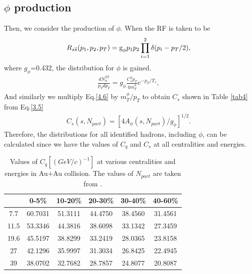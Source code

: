 \documentclass[twocolumn,aps,superscriptaddress,showpacs,nofootinbib,floatfix]{revtex4}
\begin{document}
\subsection{$\phi$ production}
Then, we consider the production of $\phi$. When the RF is taken to be \cite{Hwa:2006vb}
\begin{eqnarray}
R_{s\overline s}(p_1,p_2,p_T)={\text g}_{\phi}p_1p_2 \prod \limits_{i=1}^2\delta(p_i-p_T/2),\label{4.5}
\end{eqnarray}
where $g_{\phi}$=0.432, the distribution for $\phi$ is gained.
\begin{eqnarray}
	\frac{dN_{\phi}^{TT}}{p_Tdp_T}=g_{\phi}\frac{C_s^2p_T}{4m_T^{\phi}}e^{-p_T/T_s}, \label{4.6}
\end{eqnarray}
And similarly we multiply Eq.\ref{4.6} by $m_T^{\phi}/p_T$ to obtain $C_s$ shown in Table \ref{tab4} from Eq.\ref{3.5}
\begin{eqnarray}
C_s(s,N_{part})=[4A_{\phi}(s,N_{part})/g_{\phi}]^{1/2} .\label{4.7}
\end{eqnarray}
Therefore, the distributions for all identified hadrons, including $\phi$, can be calculated since we have the values of $C_q$ and $C_s$ at all centralities and energies.
\begin{table}[htbp]
		\centering
			\begin{tabular}{cccccc}
				\hline
				\hline
				\diagbox[width=12em]{$\sqrt{s}$(GeV)}{centrality}   &  0-5\%&10-20\%&20-30\%&30-40\%&40-60\%\\
				\hline
				7.7  &  60.7031  & 51.3111 &  44.4750  & 38.4560 &  31.4561\\
				11.5 &  53.3346 &  44.3816  & 38.6098 &  33.1342  & 27.3459\\
				19.6	&  45.5197 &  38.8299  & 33.2419 &  28.0365  & 23.8158\\
				27  &  42.1296 &  35.9997  & 31.3034 &  26.8425  & 22.4945\\
				39   &  38.0702 &  32.7682  & 28.7857 &  24.8077  & 20.8087\\
				\hline
				\hline
			\end{tabular}
	\caption{Values of $C_q[(GeV/c)^{-1}]$ at various centralities and energies in Au+Au collision. The values of $N_{part}$ are taken from \cite{STAR:2017sal}.} 
	\label{tab3}
\end{table}
\end{document}
